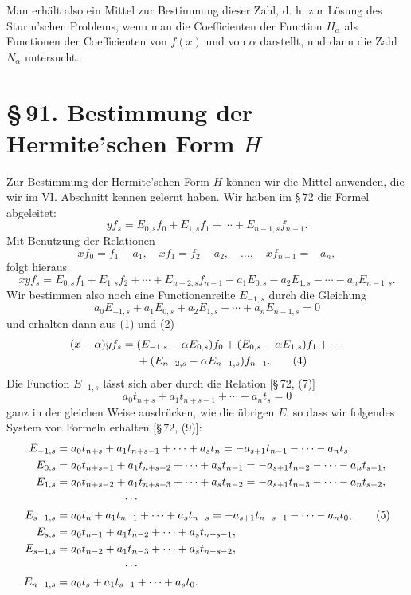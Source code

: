 \documentclass[11pt]{article}
\providecommand{\sect}[2]{\section*{\S\,#1. #2}}
\begin{document}
Man erhält also ein Mittel zur Bestimmung dieser Zahl, d. h. zur Lösung des Sturm'schen Problems, wenn man die Coefficienten der Function $H_\alpha$ als Functionen der Coefficienten von $f(x)$ und von $\alpha$ darstellt, und dann die Zahl $N_\alpha$ untersucht.

\sect{91}{Bestimmung der Hermite'schen Form $H$}

Zur Bestimmung der Hermite'schen Form $H$ können wir die Mittel anwenden, die wir im VI. Abschnitt kennen gelernt haben. Wir haben im \S\,72 die Formel abgeleitet:
\begin{equation}
yf_s=E_{0,s}f_0+E_{1,s}f_1+\cdots+E_{n-1,s}f_{n-1}.
\tag{1}
\end{equation}
Mit Benutzung der Relationen
\[
        xf_0=f_1-a_1,
        \quad xf_1=f_2-a_2,
        \quad\ldots,
        \quad xf_{n-1}=-a_n,
\]
folgt hieraus
\begin{equation}
xyf_s=E_{0,s}f_1+E_{1,s}f_2+\cdots+E_{n-2,s}f_{n-1}
       -a_1E_{0,s}-a_2E_{1,s}-\cdots-a_nE_{n-1,s}.
\tag{2}
\end{equation}
Wir bestimmen also noch eine Functionenreihe $E_{-1,s}$ durch die Gleichung
\begin{equation}
a_0E_{-1,s}+a_1E_{0,s}+a_2E_{1,s}+\cdots+a_nE_{n-1,s}=0
\tag{3}
\end{equation}
und erhalten dann aus (1) und (2)
\begin{align}
(x-\alpha)yf_s={}&(E_{-1,s}-\alpha E_{0,s})f_0+(E_{0,s}-\alpha E_{1,s})f_1+\cdots\notag\\
&+(E_{n-2,s}-\alpha E_{n-1,s})f_{n-1}.
\tag{4}
\end{align}
Die Function $E_{-1,s}$ lässt sich aber durch die Relation [\S\,72, (7)]
\[
        a_0t_{n+s}+a_1t_{n+s-1}+\cdots+a_nt_s=0
\]
ganz in der gleichen Weise ausdrücken, wie die übrigen $E$, so dass wir folgendes System von Formeln erhalten [\S\,72, (9)]:
\begin{align}
E_{-1,s}&=a_0t_{n+s}+a_1t_{n+s-1}+\cdots+a_st_n
          =-a_{s+1}t_{n-1}-\cdots-a_nt_s,\notag\\
E_{0,s}&=a_0t_{n+s-1}+a_1t_{n+s-2}+\cdots+a_st_{n-1}
          =-a_{s+1}t_{n-2}-\cdots-a_nt_{s-1},\notag\\
E_{1,s}&=a_0t_{n+s-2}+a_1t_{n+s-3}+\cdots+a_st_{n-2}
          =-a_{s+1}t_{n-3}-\cdots-a_nt_{s-2},\notag\\
&\hspace{6em}\cdots\notag\\
E_{s-1,s}&=a_0t_n+a_1t_{n-1}+\cdots+a_st_{n-s}
          =-a_{s+1}t_{n-s-1}-\cdots-a_nt_0,\tag{5}\\
E_{s,s}&=a_0t_{n-1}+a_1t_{n-2}+\cdots+a_st_{n-s-1},\notag\\
E_{s+1,s}&=a_0t_{n-2}+a_1t_{n-3}+\cdots+a_st_{n-s-2},\notag\\
&\hspace{6em}\cdots\notag\\
E_{n-1,s}&=a_0t_s+a_1t_{s-1}+\cdots+a_st_0.
\notag
\end{align}
\end{document}
